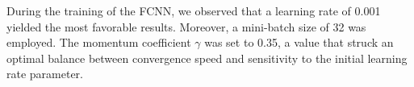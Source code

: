 \documentclass[a4paper, UKenglish, 11pt]{uiomaster}
\begin{document}
During the training of the FCNN, we observed that a learning rate of 0.001 yielded the most favorable results. Moreover, a mini-batch size of 32 was employed. The momentum coefficient $\gamma$ was set to 0.35, a value that struck an optimal balance between convergence speed and sensitivity to the initial learning rate parameter.





%
%
%
\end{document}
